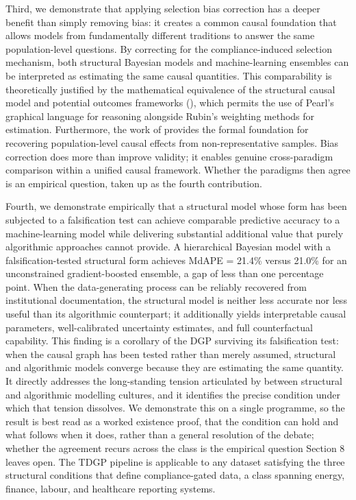 Third, we demonstrate that applying selection bias correction has a deeper benefit than simply removing bias: it creates a common causal foundation that allows models from fundamentally different traditions to answer the same population-level questions. By correcting for the compliance-induced selection mechanism, both structural Bayesian models and machine-learning ensembles can be interpreted as estimating the same causal quantities. This comparability is theoretically justified by the mathematical equivalence of the structural causal model and potential outcomes frameworks (), which permits the use of Pearl's graphical language for reasoning alongside Rubin's weighting methods for estimation. Furthermore, the work of  provides the formal foundation for recovering population-level causal effects from non-representative samples. Bias correction does more than improve validity; it enables genuine cross-paradigm comparison within a unified causal framework. Whether the paradigms then agree is an empirical question, taken up as the fourth contribution.

Fourth, we demonstrate empirically that a structural model whose form has been subjected to a falsification test can achieve comparable predictive accuracy to a machine-learning model while delivering substantial additional value that purely algorithmic approaches cannot provide. A hierarchical Bayesian model with a falsification-tested structural form achieves MdAPE = 21.4\% versus 21.0\% for an unconstrained gradient-boosted ensemble, a gap of less than one percentage point. When the data-generating process can be reliably recovered from institutional documentation, the structural model is neither less accurate nor less useful than its algorithmic counterpart; it additionally yields interpretable causal parameters, well-calibrated uncertainty estimates, and full counterfactual capability. This finding is a corollary of the DGP surviving its falsification test: when the causal graph has been tested rather than merely assumed, structural and algorithmic models converge because they are estimating the same quantity. It directly addresses the long-standing tension articulated by  between structural and algorithmic modelling cultures, and it identifies the precise condition under which that tension dissolves. We demonstrate this on a single programme, so the result is best read as a worked existence proof, that the condition can hold and what follows when it does, rather than a general resolution of the debate; whether the agreement recurs across the class is the empirical question Section 8 leaves open. The TDGP pipeline is applicable to any dataset satisfying the three structural conditions that define compliance-gated data, a class spanning energy, finance, labour, and healthcare reporting systems.

